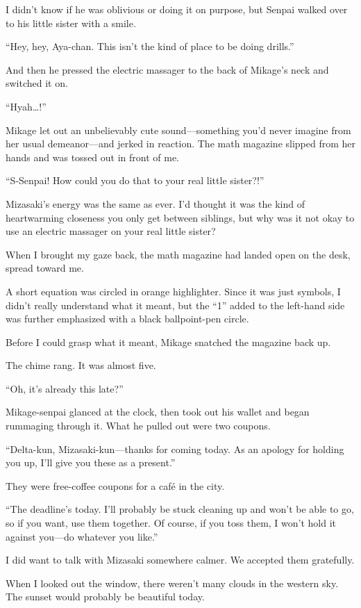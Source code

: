 \documentclass[
    a4paper,
    12pt,
    twoside,
    openany,
    UTF8,
    fontset=windows
]{ctexbook}
\begin{document}
I didn't know if he was oblivious or doing it on purpose, but Senpai walked over to his little sister with a smile.

``Hey, hey, Aya-chan. This isn't the kind of place to be doing drills.''

And then he pressed the electric massager to the back of Mikage's neck and switched it on.

``Hyah\dots!''

Mikage let out an unbelievably cute sound---something you'd never imagine from her usual demeanor---and jerked in reaction. The math magazine slipped from her hands and was tossed out in front of me.

``S-Senpai! How could you do that to your real little sister?!''

Mizasaki's energy was the same as ever. I'd thought it was the kind of heartwarming closeness you only get between siblings, but why was it not okay to use an electric massager on your real little sister?

When I brought my gaze back, the math magazine had landed open on the desk, spread toward me.

A short equation was circled in orange highlighter. Since it was just symbols, I didn't really understand what it meant, but the ``1'' added to the left-hand side was further emphasized with a black ballpoint-pen circle.

Before I could grasp what it meant, Mikage snatched the magazine back up.

The chime rang. It was almost five.

``Oh, it's already this late?''

Mikage-senpai glanced at the clock, then took out his wallet and began rummaging through it. What he pulled out were two coupons.

``Delta-kun, Mizasaki-kun---thanks for coming today. As an apology for holding you up, I'll give you these as a present.''

They were free-coffee coupons for a café in the city.

``The deadline's today. I'll probably be stuck cleaning up and won't be able to go, so if you want, use them together. Of course, if you toss them, I won't hold it against you---do whatever you like.''

I did want to talk with Mizasaki somewhere calmer. We accepted them gratefully.

When I looked out the window, there weren't many clouds in the western sky. The sunset would probably be beautiful today.
\end{document}
